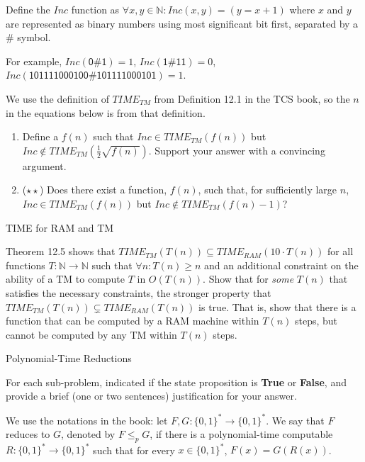 \documentclass[11pt]{article}
\begin{document}
Define the $\mathit{Inc}$ function as $\forall x, y \in \mathbb{N}: \mathit{Inc}(x, y) = (y = x + 1)$ where $x$ and $y$ are represented as binary numbers using most significant bit first, separated by a $\mathsf{\#}$ symbol.

For example,
$\mathit{Inc}(\mathsf{0\#1}) = 1$, 
$\mathit{Inc}(\mathsf{1\#11}) = 0$,
$\mathit{Inc}(\mathsf{101111000100\#101111000101}) = 1$.

We use the definition of $\mathit{TIME}_{TM}$ from Definition 12.1 in the TCS book, so the $n$ in the equations below is from that definition. 

\begin{enumerate}
\item Define a $f(n)$ such that $Inc \in \mathit{TIME}_{TM}(f(n))$ but $Inc \notin \mathit{TIME}_{TM}(\frac{1}{2}\sqrt{f(n)})$. Support your answer with a convincing argument.

\item ($\star\star$) Does there exist a function, $f(n)$, such that, for sufficiently large $n$, $Inc \in \mathit{TIME}_{TM}(f(n))$ but $Inc \notin \mathit{TIME}_{TM}(f(n) - 1)$? 
\end{enumerate}


\begin{problem} 
TIME for RAM and TM 
\end{problem}

Theorem 12.5 shows that $\mathit{TIME}_{TM}(T(n)) \subseteq \mathit{TIME}_{RAM}(10 \cdot T(n))$ for all functions $T: \mathbb{N} \rightarrow \mathbb{N}$ such that $\forall n: T(n) \ge n$ and an additional constraint on the ability of a TM to compute $T$ in $O(T(n))$. Show that for \emph{some} $T(n)$ that satisfies the necessary constraints, the stronger property that
$\mathit{TIME}_{TM}(T(n)) \subsetneq \mathit{TIME}_{RAM}(T(n))$ is true. That is, show that there is a function that can be computed by a RAM machine within $T(n)$ steps, but cannot be computed by any TM within $T(n)$ steps. 

\begin{problem}
Polynomial-Time Reductions
\end{problem}

For each sub-problem, indicated if the state proposition is {\bf True} or {\bf False}, and provide a brief (one or two sentences) justification for your answer.

We use the notations in the book: let $F,G:\{0,1\}^* \rightarrow \{0,1\}^{*}$. We say that $F$ reduces to $G$, denoted by $F \leq_p G$, if there is a polynomial-time computable $R:\{0,1\}^{*} \rightarrow \{0,1\}^{*}$ such that for every $x\in \{0,1\}^{*}$, $F(x) = G(R(x))$.
\end{document}
